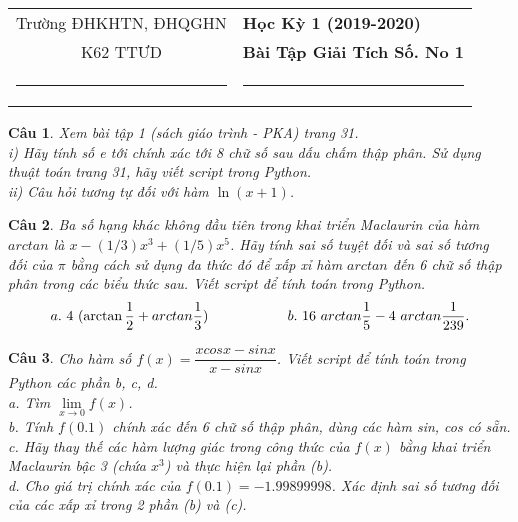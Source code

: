 \documentclass[answers]{exam}
\newtheorem{bt}{Câu}
\begin{document}
\begin{tabular*}
{\linewidth}{c>{\centering\hspace{0pt}} p{}}
Trường ĐHKHTN, ĐHQGHN & {\bf Học Kỳ 1 (2019-2020)}
\tabularnewline
K62 TTƯD & {\bf Bài Tập Giải Tích Số. No 1}
\tabularnewline
\rule{1in}{1pt}  \small  & \rule{2in}{1pt} %
\tabularnewline

\end{tabular*}
%
\printanswers


\begin{bt}\label{bt1}
Xem bài tập 1 (sách giáo trình - PKA) trang 31. \\
i) Hãy tính số e tới chính xác tới 8 chữ số sau dấu chấm thập phân. Sử dụng thuật toán trang 31, hãy viết script trong Python. \\
ii) Câu hỏi tương tự đối với hàm $\ln(x+1)$.
\end{bt}

\begin{bt}
	Ba số hạng khác không đầu tiên trong khai triển Maclaurin của hàm $arctan$ là $x - (1/3)x^3 + (1/5)x^5$. Hãy tính sai số tuyệt đối và sai số tương đối của $\pi$ bằng cách sử dụng đa thức đó để xấp xỉ hàm $arctan$ đến 6 chữ số thập phân trong các biểu thức sau. Viết script để tính toán trong Python.
	\begin{equation*} 
	a.\ 4 \ (\arctan \frac{1}{2} + arctan \frac{1}{3}) \hskip 2cm b.\ 16 \ arctan \frac{1}{5} - 4 \ arctan \frac{1}{239}.
	\end{equation*}
\end{bt}

\begin{bt}
	Cho hàm số $f(x) = \dfrac{x cos x - sin x}{x - sin x}$. Viết script để tính toán trong Python các phần b, c, d.\\
	a. Tìm $\underset{x \rightarrow 0}{\lim} f(x)$. \\
	b. Tính $f(0.1)$ chính xác đến 6 chữ số thập phân, dùng các hàm sin, cos có sẵn. \\
	c. Hãy thay thế các hàm lượng giác trong công thức của $f(x)$ bằng khai triển Maclaurin bậc 3 (chứa $x^3$) và thực hiện lại phần (b). \\
	d. Cho giá trị chính xác của $f (0.1)=-1.99899998$. Xác định sai số tương đối của các xấp xỉ trong 2 phần (b) và (c).	
\end{bt}
\end{document}
